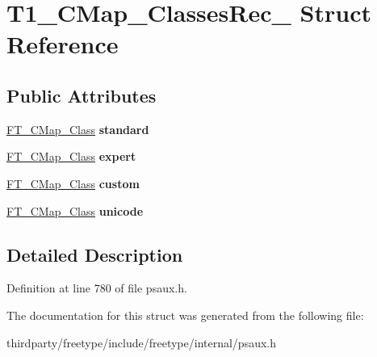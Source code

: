 \hypertarget{struct_t1___c_map___classes_rec__}{}\section{T1\+\_\+\+C\+Map\+\_\+\+Classes\+Rec\+\_\+ Struct Reference}
\label{struct_t1___c_map___classes_rec__}
\subsection*{Public Attributes}
\begin{DoxyCompactItemize}
\item 
\mbox{\label{struct_t1___c_map___classes_rec___a11bc9e986af1c0cf91bd67e2e30028ca}} 
\hyperlink{struct_f_t___c_map___class_rec__}{F\+T\+\_\+\+C\+Map\+\_\+\+Class} {\bfseries standard}
\item 
\mbox{\label{struct_t1___c_map___classes_rec___a9576c404d5197dd66498725eacde1302}} 
\hyperlink{struct_f_t___c_map___class_rec__}{F\+T\+\_\+\+C\+Map\+\_\+\+Class} {\bfseries expert}
\item 
\mbox{\label{struct_t1___c_map___classes_rec___a21378ef457d58cc00f357011f45fba5e}} 
\hyperlink{struct_f_t___c_map___class_rec__}{F\+T\+\_\+\+C\+Map\+\_\+\+Class} {\bfseries custom}
\item 
\mbox{\label{struct_t1___c_map___classes_rec___aab1eef66893dd7b0d25897612d056d4a}} 
\hyperlink{struct_f_t___c_map___class_rec__}{F\+T\+\_\+\+C\+Map\+\_\+\+Class} {\bfseries unicode}
\end{DoxyCompactItemize}


\subsection{Detailed Description}


Definition at line 780 of file psaux.\+h.



The documentation for this struct was generated from the following file\+:\begin{DoxyCompactItemize}
\item 
thirdparty/freetype/include/freetype/internal/psaux.\+h\end{DoxyCompactItemize}
